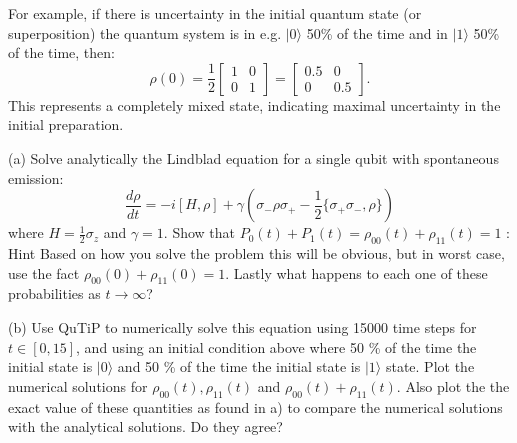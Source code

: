 \documentclass[12pt]{article}
\newcommand{\ket}[1]{| #1 \rangle}
\begin{document}
For example, if there is uncertainty in the initial quantum state (or superposition) the quantum system is in e.g. $|0\rangle$ 50\% of the time and in $|1\rangle$ 50\% of the time, then:
\begin{equation*}
    \rho(0) = \frac{1}{2} \begin{bmatrix} 1 & 0 \\ 0 & 1 \end{bmatrix} = \begin{bmatrix} 0.5 & 0 \\ 0 & 0.5 \end{bmatrix}.
\end{equation*}
This represents a completely mixed state, indicating maximal uncertainty in the initial preparation.

(a) Solve analytically the Lindblad equation for a single qubit with spontaneous emission:
\begin{equation}
    \frac{d\rho}{dt} = -i[H, \rho] + \gamma (\sigma_- \rho \sigma_+ - \frac{1}{2}\{\sigma_+ \sigma_-, \rho\})
\end{equation}
where $H = \frac{1}{2} \sigma_z$ and $\gamma = 1$. Show that $P_0(t) + P_1(t) = \rho_{00}(t) + \rho_{11}(t)=1 $ : Hint Based on how you solve the problem this will be obvious, but in worst case, use the fact $\rho_{00}(0) +\rho_{11}(0)=1$. Lastly what happens to each one of these probabilities as $t \rightarrow \infty$?

(b) Use QuTiP to numerically solve this equation using 15000 time steps for $t\in[0,15]$, and using an initial condition above where 50 \% of the time the initial state is $\ket{0}$ and 50 \% of the time the initial state is $\ket{1}$ state. Plot  the numerical solutions for $\rho_{00}(t), \rho_{11}(t)$ and $\rho_{00}(t) + \rho_{11}(t)$. Also plot the the exact value of these quantities as found in a) to compare the numerical solutions with the analytical solutions. Do they agree?
\end{document}
